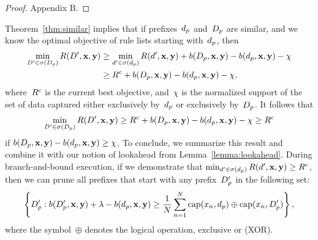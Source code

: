 \begin{arxiv}
\begin{proof}
Appendix B.
\end{proof}

Theorem~\ref{thm:similar} implies that if prefixes~$d_p$
and~$D_p$ are similar, and we know the optimal objective
of rule lists starting with~$d_p$, then
\begin{align}
\min_{{D}' \in \sigma(D_p)} R({D}', \mathbf{x}, \mathbf{y})
&\ge \min_{{d}' \in \sigma(d_p)} R({d}', \mathbf{x}, \mathbf{y})
+ b(D_p, \mathbf{x}, \mathbf{y}) - b(d_p, \mathbf{x}, \mathbf{y}) - \chi \nonumber \\
&\ge {R^c} + b(D_p, \mathbf{x}, \mathbf{y}) - b(d_p, \mathbf{x}, \mathbf{y}) - \chi,
\end{align}
where~${R^c}$ is the current best objective,
and~$\chi$ is the normalized support of the set of data captured
either exclusively by~$d_p$ or exclusively by~$D_p$.
%
It follows that
\begin{align}
\min_{{D}' \in \sigma(D_p)} R({D}', \mathbf{x}, \mathbf{y})
\ge {R^c} + b(D_p, \mathbf{x}, \mathbf{y}) - b(d_p, \mathbf{x}, \mathbf{y}) - \chi \ge {R^c}
\end{align}
if ${b(D_p, \mathbf{x}, \mathbf{y}) - b(d_p, \mathbf{x}, \mathbf{y}) \ge \chi}$.
%
To conclude, we summarize this result and combine it with
our notion of lookahead from Lemma~\ref{lemma:lookahead}.
%
During branch-and-bound execution, if we demonstrate that
${\min_{{d}' \in \sigma(d_p)} R({d}', \mathbf{x}, \mathbf{y}) \ge {R^c}}$,
then we can prune all prefixes that start with any
prefix~$D_p'$ in the following set:
\begin{align}
\left\{ D_p' : b(D_p', \mathbf{x}, \mathbf{y}) + {\lambda} - b(d_p, \mathbf{x}, \mathbf{y}) \ge
\frac{1}{N} \sum_{n=1}^N \textnormal{cap}(x_n, d_p) \oplus \textnormal{cap}(x_n, D_p') \right\},
\end{align}
where the symbol~$\oplus$ denotes the logical operation, exclusive or (XOR).


\end{arxiv}
